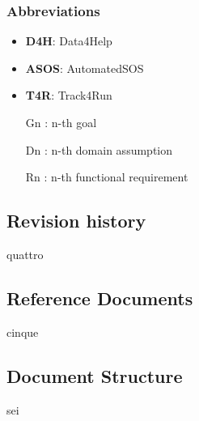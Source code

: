\subsubsection{Abbreviations}
\begin{itemize}
\item \textbf{D4H}: Data4Help
\item \textbf{ASOS}: AutomatedSOS
\item \textbf{T4R}: Track4Run
\end{itemize}

\begin{itemize}
\item [Gn]: n-th goal
\item [Dn]: n-th domain assumption
\item [Rn]: n-th functional requirement
\end{itemize}
\subsection{Revision history}
quattro
\subsection{Reference Documents}
cinque
\subsection{Document Structure}
sei
